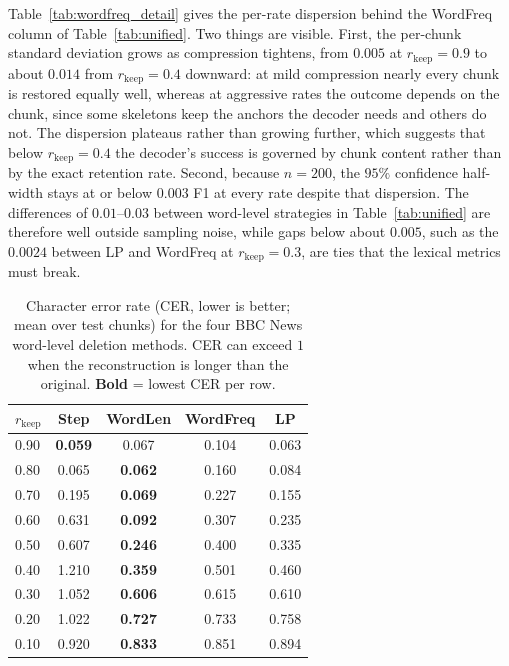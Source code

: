 \documentclass[11pt]{article}
\newcommand{\rkeep}{r_{\mathrm{keep}}}
\begin{document}
Table~\ref{tab:wordfreq_detail} gives the per-rate dispersion behind the WordFreq column of
Table~\ref{tab:unified}. Two things are visible. First, the per-chunk standard deviation grows as
compression tightens, from $0.005$ at $\rkeep = 0.9$ to about $0.014$ from $\rkeep = 0.4$ downward:
at mild compression nearly every chunk is restored equally well, whereas at aggressive rates the outcome
depends on the chunk, since some skeletons keep the anchors the decoder needs and others do not. The
dispersion plateaus rather than growing further, which suggests that below $\rkeep = 0.4$ the
decoder's success is governed by chunk content rather than by the exact retention rate. Second, because
$n = 200$, the $95\%$ confidence half-width stays at or below $0.003$ F1 at every rate despite that
dispersion. The differences of $0.01$--$0.03$ between word-level strategies in
Table~\ref{tab:unified} are therefore well outside sampling noise, while gaps below about $0.005$,
such as the $0.0024$ between LP and WordFreq at $\rkeep = 0.3$, are ties that the lexical metrics
must break.

\begin{table}[tbp]
\centering
\small
\caption{Character error rate (CER, lower is better; mean over test chunks) for the four BBC News
word-level deletion methods. CER can exceed $1$ when the reconstruction is longer than the original.
\textbf{Bold} = lowest CER per row.}
\label{tab:cer_detail}
\begin{tabular}{lcccc}
\toprule
$\rkeep$ & Step & WordLen & WordFreq & LP \\
\midrule
0.90 & \textbf{0.059} & 0.067 & 0.104 & 0.063 \\
0.80 & 0.065 & \textbf{0.062} & 0.160 & 0.084 \\
0.70 & 0.195 & \textbf{0.069} & 0.227 & 0.155 \\
0.60 & 0.631 & \textbf{0.092} & 0.307 & 0.235 \\
0.50 & 0.607 & \textbf{0.246} & 0.400 & 0.335 \\
0.40 & 1.210 & \textbf{0.359} & 0.501 & 0.460 \\
0.30 & 1.052 & \textbf{0.606} & 0.615 & 0.610 \\
0.20 & 1.022 & \textbf{0.727} & 0.733 & 0.758 \\
0.10 & 0.920 & \textbf{0.833} & 0.851 & 0.894 \\
\bottomrule
\end{tabular}
\end{table}
\end{document}
